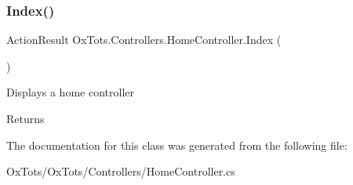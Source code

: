 \subsubsection{\texorpdfstring{Index()}{Index()}}
{\footnotesize\ttfamily Action\+Result Ox\+Tots.\+Controllers.\+Home\+Controller.\+Index (\begin{DoxyParamCaption}{ }\end{DoxyParamCaption})\hspace{0.3cm}{\ttfamily [inline]}}



Displays a home controller 

\begin{DoxyReturn}{Returns}

\end{DoxyReturn}


The documentation for this class was generated from the following file\+:\begin{DoxyCompactItemize}
\item 
Ox\+Tots/\+Ox\+Tots/\+Controllers/Home\+Controller.\+cs\end{DoxyCompactItemize}
